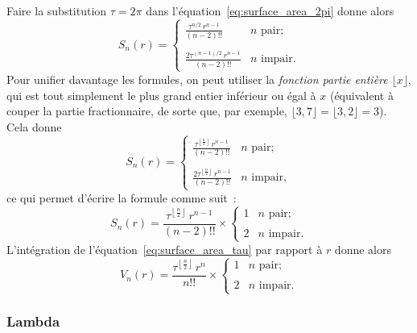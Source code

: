 Faire la substitution $\tau=2\pi$ dans l'équation~\eqref{eq:surface_area_2pi} donne alors
\[
S_n(r) = \begin{cases}
\displaystyle \frac{\tau^{n/2}\,r^{n-1}}{(n-2)!!} & n \text{ pair}; \\ \\
\displaystyle \frac{2\tau^{(n-1)/2}\,r^{n-1}}{(n-2)!!} & n \text{ impair}.
\end{cases} \]
Pour unifier davantage les formules, on peut utiliser la \emph{fonction partie entière} $\lfloor x \rfloor$, qui est tout simplement le plus grand entier inférieur ou égal à $x$ (équivalent à couper la partie fractionnaire, de sorte que, par exemple, $\lfloor 3{,}7 \rfloor = \lfloor 3{,}2 \rfloor = 3$). Cela donne
\[ S_n(r) = \begin{cases}
 \displaystyle \frac{\tau^{\left\lfloor \frac{n}{2} \right\rfloor}\,r^{n-1}}{(n-2)!!} & n \text{ pair}; \\ \\
 \displaystyle \frac{2\tau^{\left\lfloor \frac{n}{2} \right\rfloor}\,r^{n-1}}{(n-2)!!} & n \text{ impair},
 \end{cases} \]
ce qui permet d'écrire la formule comme suit~:
\begin{equation}
\label{eq:surface_area_tau}
S_n(r) = \frac{\tau^{\left\lfloor \frac{n}{2} \right\rfloor}\,r^{n-1}}{(n-2)!!}\times \begin{cases}
1 & n \text{ pair}; \\ \\
2 & n \text{ impair}.
\end{cases}
\end{equation}
L'intégration de l'équation~\eqref{eq:surface_area_tau} par rapport à $r$ donne alors
\begin{equation}
\label{eq:volume_tau}
V_n(r) = \frac{\tau^{\left\lfloor \frac{n}{2} \right\rfloor}\,r^n}{n!!}\times \begin{cases}
1 & n \text{ pair}; \\ \\
2 & n \text{ impair}.
\end{cases}
\end{equation}

\subsubsection{Lambda} %
\label{sec:lambda}


